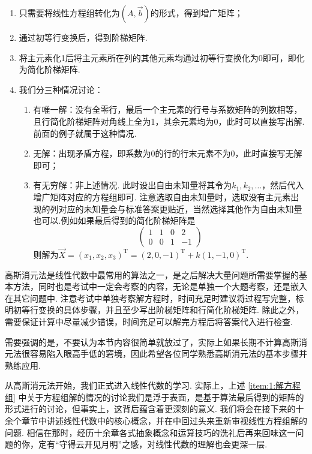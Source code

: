 \begin{enumerate}[label=步骤\arabic*~]
    \item 只需要将线性方程组转化为$(A, \vec{b})$的形式，得到增广矩阵；

    \item 通过初等行变换后，得到阶梯矩阵.

    \item 将主元素化1后将主元素所在列的其他元素均通过初等行变换化为0即可，即化为简化阶梯矩阵.

    \item \label{item:1:解方程组}
          我们分三种情况讨论：
          \begin{enumerate}
              \item 有唯一解：没有全零行，最后一个主元素的行号与系数矩阵的列数相等，且行简化阶梯矩阵对角线上全为1，其余元素均为0，此时可以直接写出解.前面的例子就属于这种情况.

              \item 无解：出现矛盾方程，即系数为0的行的行末元素不为0，此时直接写无解即可；

              \item 有无穷解：非上述情况. 此时设出自由未知量将其令为$k_1,k_2,\ldots$，然后代入增广矩阵对应的方程组即可. 注意选取自由未知量时，选取没有主元素出现的列对应的未知量会与标准答案更贴近，当然选择其他作为自由未知量也可以.例如如果最后得到的简化阶梯矩阵是
              \[\begin{pmatrix}
                1 & 1 & 0 & 2 \\
                0 & 0 & 1 & -1
             \end{pmatrix}\]
              则解为$\vec{X}=(x_1,x_2,x_3)^\mathrm{T}=(2,0,-1)^\mathrm{T}+k(1,-1,0)^\mathrm{T}$.
          \end{enumerate}
\end{enumerate}

高斯消元法是线性代数中最常用的算法之一，是之后解决大量问题所需要掌握的基本方法，同时也是考试中一定会考察的内容，无论是单独一个大题考察，还是嵌入在其它问题中.
注意考试中单独考察解方程时，时间充足时建议将过程写完整，标明初等行变换的具体步骤，并且至少写出阶梯矩阵和行简化阶梯矩阵. 除此之外，需要保证计算中尽量减少错误，时间充足可以解完方程后将答案代入进行检查.

需要强调的是，不要认为本节内容很简单就放过了，实际上如果长期不计算高斯消元法很容易陷入眼高手低的窘境，因此希望各位同学熟悉高斯消元法的基本步骤并熟练应用.



从高斯消元法开始，我们正式进入线性代数的学习. 实际上，上述 \ref*{item:1:解方程组} 中关于方程组解的情况的讨论我们是浮于表面，是基于算法最后得到的矩阵的形式进行的讨论，但事实上，这背后蕴含着更深刻的意义. 我们将会在接下来的十余个章节中讲述线性代数中的核心概念，并在中回过头来重新审视线性方程组解的问题. 相信在那时，经历十余章各式抽象概念和运算技巧的洗礼后再来回味这一问题的你，定有``守得云开见月明''之感，对线性代数的理解也会更深一层.

